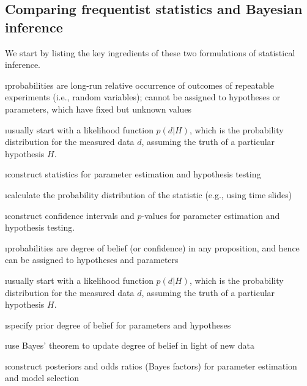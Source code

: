 \subsection{Comparing frequentist statistics and Bayesian inference}

We start by listing the key ingredients of these two formulations 
of statistical inference.
\medskip


\bi

\i probabilities are long-run relative occurrence of 
outcomes of repeatable experiments (i.e., random variables);
cannot be assigned to hypotheses or parameters, 
which have fixed but unknown values

\i usually start with a likelihood function $p(d|H)$,
which is the probability distribution for the 
measured data $d$, assuming the truth of a particular
hypothesis $H$.

\i construct statistics for parameter estimation and
hypothesis testing

\i calculate the probability distribution of the 
statistic (e.g., using time slides)

\i construct confidence intervals and $p$-values for 
parameter estimation and hypothesis testing.

\ei


\bi

\i probabilities are degree of belief (or confidence)
in any proposition, and hence 
can be assigned to hypotheses and parameters

\i usually start with a likelihood function $p(d|H)$,
which is the probability distribution for the 
measured data $d$, assuming the truth of a particular
hypothesis $H$.

\i specify prior degree of belief for parameters and 
hypotheses

\i use Bayes' theorem to update degree of belief in
light of new data 

\i construct posteriors and odds ratios (Bayes factors)
for parameter estimation and model selection

\ei
\medskip

